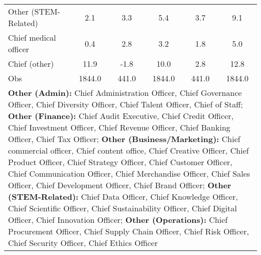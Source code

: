 \begin{table}[htbp]
\begin{tabular}{l*{5}{c}}
Other (STEM-Related)&         2.1&         3.3&         5.4&         3.7&         9.1\\
Chief medical officer&         0.4&         2.8&         3.2&         1.8&         5.0\\
Chief (other)       &        11.9&        -1.8&        10.0&         2.8&        12.8\\
Obs                 &      1844.0&       441.0&      1844.0&       441.0&      1844.0\\
\bottomrule
\multicolumn{6}{l}{\footnotesize \textbf{Other (Admin):} Chief Administration Officer, Chief Governance Officer, Chief Diversity Officer, Chief Talent Officer, Chief of Staff; \textbf{Other (Finance):} Chief Audit Executive, Chief Credit Officer, Chief Investment Officer, Chief Revenue Officer, Chief Banking Officer, Chief Tax Officer; \textbf{Other (Business/Marketing):} Chief commercial officer, Chief content office, Chief Creative Officer, Chief Product Officer, Chief Strategy Officer, Chief Customer Officer, Chief Communication Officer, Chief Merchandise Officer, Chief Sales Officer, Chief Development Officer, Chief Brand Officer; \textbf{Other (STEM-Related): } Chief Data Officer, Chief Knowledge Officer, Chief Scientific Officer, Chief Sustainability Officer, Chief Digital Officer, Chief Innovation Officer; \textbf{Other (Operations): } Chief Procurement Officer, Chief Supply Chain Officer, Chief Risk Officer, Chief Security Officer, Chief Ethics Officer}\\
\end{tabular}
\end{table}
